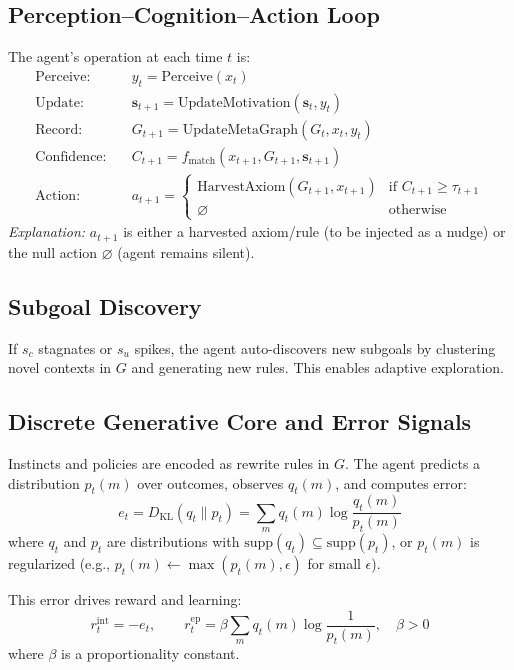 \documentclass[11pt]{article}
\begin{document}
\subsection{Perception--Cognition--Action Loop}
The agent's operation at each time $t$ is:
\begin{align*}
  \text{Perceive:} &\quad y_t = \mathrm{Perceive}(x_t) \\
  \text{Update:} &\quad \mathbf{s}_{t+1} = \mathrm{UpdateMotivation}(\mathbf{s}_t, y_t) \\
  \text{Record:} &\quad G_{t+1} = \mathrm{UpdateMetaGraph}(G_t, x_t, y_t) \\
  \text{Confidence:} &\quad C_{t+1} = f_\mathrm{match}(x_{t+1}, G_{t+1}, \mathbf{s}_{t+1}) \\
  \text{Action:} &\quad a_{t+1} = \begin{cases}
    \mathrm{HarvestAxiom}(G_{t+1}, x_{t+1}) & \text{if } C_{t+1} \geq \tau_{t+1} \\
    \varnothing & \text{otherwise}
  \end{cases}
\end{align*}
\textit{Explanation:} $a_{t+1}$ is either a harvested axiom/rule (to be injected as a nudge) or the null action $\varnothing$ (agent remains silent).
\subsection{Subgoal Discovery}
If $s_c$ stagnates or $s_u$ spikes, the agent auto-discovers new subgoals by clustering novel contexts in $G$ and generating new rules. This enables adaptive exploration.

\subsection{Discrete Generative Core and Error Signals}
Instincts and policies are encoded as rewrite rules in $G$. The agent predicts a distribution $p_t(m)$ over outcomes, observes $q_t(m)$, and computes error:
\[
  e_t = D_{\mathrm{KL}}(q_t\|p_t) = \sum_m q_t(m) \log \frac{q_t(m)}{p_t(m)}
\]
where $q_t$ and $p_t$ are distributions with $\mathrm{supp}(q_t) \subseteq \mathrm{supp}(p_t)$, or $p_t(m)$ is regularized (e.g., $p_t(m) \leftarrow \max(p_t(m), \epsilon)$ for small $\epsilon$).

This error drives reward and learning:
\[
  r^{\mathrm{int}}_t = -e_t, \qquad r^{\mathrm{ep}}_t = \beta \sum_m q_t(m)\log\frac{1}{p_t(m)}, \quad \beta > 0
\]
where $\beta$ is a proportionality constant.
\end{document}
